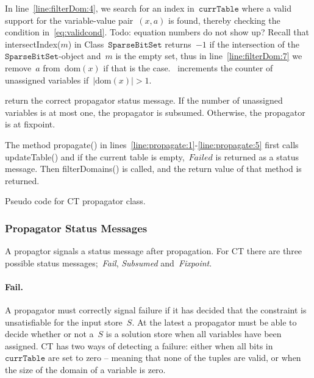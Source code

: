 \documentclass[a4paper,11pt]{article}
\newcommand{\Todo}[1]{{\color{blue}Todo: #1}}
\newcommand{\Dom}[1]{\text{dom}({#1})}
\newcommand{\SparseBitSet}{\texttt{SparseBitSet}}
\newcommand{\CurrTable}{\texttt{currTable}}
\numberwithin{equation}{section}
\begin{document}
\begin{enumerate}
  In line~\ref{line:filterDom:4}, we search for an index in~$\CurrTable$
  where a valid support for the variable-value pair~$(x,a)$ is found, 
  thereby checking the condition in~\eqref{eq:validcond}.
  \Todo{equation numbers do not show up?}
  Recall that intersectIndex($m$) in Class~$\SparseBitSet$ returns~$-1$ if
  the intersection of the~$\SparseBitSet$-object and~$m$ is the empty set,
  thus in line~\ref{line:filterDom:7} we remove~$a$ from~$\Dom{x}$ if that
  is the case.~ increments the
  counter of unassigned variables if~$|\Dom{x}| > 1$.

   return the correct
  propagator status message. If the number of unassigned variables is
  at most one, the propagator is subsumed. Otherwise, the propagator
  is at fixpoint.
  
\end{enumerate}

The method propagate() in lines~\ref{line:propagate:1}-\ref{line:propagate:5}
first calls updateTable() and if the current table is empty,~$Failed$
is returned as a status message. Then filterDomains() is called, and the
return value of that method is returned.

 \begin{algorithm}[h]
  \begin{algorithmic}[1]  %
    
    \end{algorithmic}
  \caption{Pseudo code for CT propagator class.}
  \label{algo:CT}
\end{algorithm}

\subsubsection{Propagator Status Messages}
A propagtor signals a status message after propagation.
For CT there are three possible status messages;~\emph{Fail},
\emph{Subsumed} and~\emph{Fixpoint}.

\paragraph{Fail.}
A propagator must correctly signal failure
if it has decided that the constraint is unsatisfiable for the input store~$S$.
At the latest a propagator must be
able to decide whether or not a~$S$ is a solution store when all
variables have been assigned.
CT has two ways of detecting a failure: either when all bits in~$\CurrTable$
are set to zero -- meaning that none of the tuples are valid, or when the
size of the domain of a variable is zero.
\end{document}
